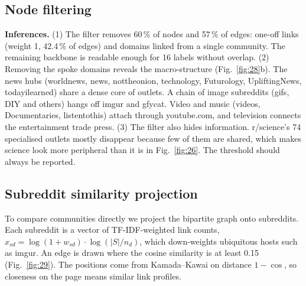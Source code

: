 \subsection{Node filtering}

\textbf{Inferences.}
(1) The filter removes 60\,\% of nodes and 57\,\% of edges: one-off links (weight 1, 42.4\,\% of edges) and domains linked from a
single community. The remaining backbone is readable enough for 16 labels without overlap.
(2) Removing the spoke domains reveals the macro-structure (Fig.~\ref{fig:28}b). The news hubs (worldnews, news,
nottheonion, technology, Futurology, UpliftingNews, todayilearned) share a dense core of outlets. A chain of image
subreddits (gifs, DIY and others) hangs off imgur and gfycat. Video and music (videos, Documentaries, listentothis) attach
through youtube.com, and television connects the entertainment trade press.
(3) The filter also hides information. r/science's 74 specialised outlets mostly disappear because few of them are shared,
which makes science look more peripheral than it is in Fig.~\ref{fig:26}. The threshold should always be reported.

\subsection{Subreddit similarity projection}
To compare communities directly we project the bipartite graph onto subreddits. Each subreddit is a vector of
TF-IDF-weighted link counts, $x_{sd}=\log(1+w_{sd})\cdot\log(|S|/n_d)$, which down-weights ubiquitous hosts such as imgur.
An edge is drawn where the cosine similarity is at least 0.15 (Fig.~\ref{fig:29}). The positions come from Kamada--Kawai
on distance $1-\cos$, so closeness on the page means similar link profiles.


